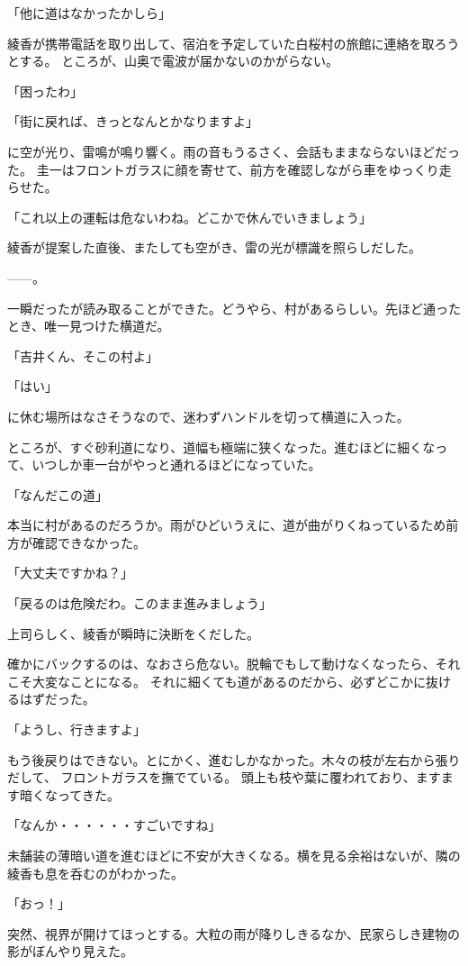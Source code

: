 ﻿\documentclass[book,tate]{jlreq}
\begin{document}
「他に道はなかったかしら」

綾香が携帯電話を取り出して、宿泊を予定していた白桜村の旅館に連絡を取ろうとする。
ところが、山奥で電波が届かないのかがらない。

「困ったわ」

「街に戻れば、きっとなんとかなりますよ」

に空が光り、雷鳴が鳴り響く。雨の音もうるさく、会話もままならないほどだった。
圭一はフロントガラスに顔を寄せて、前方を確認しながら車をゆっくり走らせた。

「これ以上の運転は危ないわね。どこかで休んでいきましょう」

綾香が提案した直後、またしても空がき、雷の光が標識を照らしだした。

------。

一瞬だったが読み取ることができた。どうやら、村があるらしい。先ほど通ったとき、唯一見つけた横道だ。

「吉井くん、そこの村よ」

「はい」

に休む場所はなさそうなので、迷わずハンドルを切って横道に入った。

ところが、すぐ砂利道になり、道幅も極端に狭くなった。進むほどに細くなって、いつしか車一台がやっと通れるほどになっていた。

「なんだこの道」

本当に村があるのだろうか。雨がひどいうえに、道が曲がりくねっているため前方が確認できなかった。

「大丈夫ですかね？」

「戻るのは危険だわ。このまま進みましょう」

上司らしく、綾香が瞬時に決断をくだした。

確かにバックするのは、なおさら危ない。脱輪でもして動けなくなったら、それこそ大変なことになる。
それに細くても道があるのだから、必ずどこかに抜けるはずだった。

「ようし、行きますよ」

もう後戻りはできない。とにかく、進むしかなかった。木々の枝が左右から張りだして、
フロントガラスを撫でている。 頭上も枝や葉に覆われており、ますます暗くなってきた。

「なんか・・・・・・すごいですね」

未舗装の薄暗い道を進むほどに不安が大きくなる。横を見る余裕はないが、隣の綾香も息を呑むのがわかった。

「おっ！」

突然、視界が開けてほっとする。大粒の雨が降りしきるなか、民家らしき建物の影がぼんやり見えた。
\end{document}
